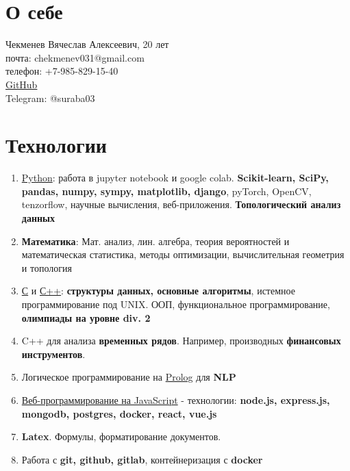 \documentclass[a4paper,12pt]{article}
\date{}
\begin{document}
\section{О себе}
      \large Чекменев Вячеслав Алексеевич, 20 лет\\
      \large почта: chekmenev031@gmail.com \\
      \large телефон: +7-985-829-15-40 \\
      \large \href{https://github.com/Suraba03}{GitHub} \\
      \large Telegram: @suraba03\\
\section{Технологии}
\begin{enumerate}
    \item \underline{Python}: работа в jupyter notebook и google colab. \textbf{Scikit-learn, SciPy, pandas, numpy, sympy, matplotlib, django}, pyTorch, OpenCV, tenzorflow, научные вычисления, веб-приложения. \textbf{Топологический анализ данных}
    \item \textbf{Математика}: Мат. анализ, лин. алгебра, теория вероятностей и математическая статистика, методы оптимизации, вычислительная геометрия и топология
    \item \underline{С} и \underline{С++}: \textbf{структуры данных, основные алгоритмы}, истемное программирование под UNIX. ООП, функциональное программирование, \textbf{олимпиады на уровне div. 2} 
    \item C++ для анализа \textbf{временных рядов}. Например, производных \textbf{финансовых инструментов}.
    \item Логическое программирование на \underline{Prolog} для \textbf{NLP}
    \item \underline{Веб-программирование на JavaScript} - технологии: \textbf{node.js, express.js, mongodb, postgres, docker, react, vue.js}
    \item \textbf{Latex}. Формулы, форматирование документов.
    \item Работа с \textbf{git, github, gitlab}, контейнеризация с \textbf{docker}

\end{enumerate}
\end{document}
